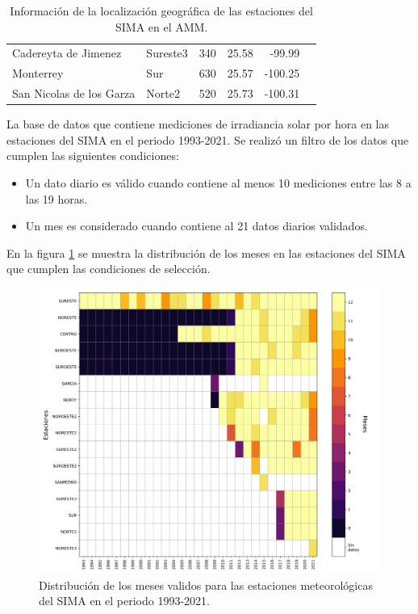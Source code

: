 \begin{table}[H]
\begin{tabular}{llcrrr}
		Cadereyta de Jimenez     & Sureste3        & 340                                                                                       & 25.58                 & -99.99                 \\
		Monterrey                & Sur             & 630                                                                                       & 25.57                 & -100.25                \\
		San Nicolas de los Garza & Norte2          & 520                                                                                       & 25.73                 & -100.31                \\ \hline
	\end{tabular}
	\caption{Información de la localización geográfica de las estaciones del SIMA en el AMM.}
	\label{table:stations_information}
\end{table}
La base de datos que contiene mediciones de irradiancia solar por hora en las estaciones del SIMA en el periodo 1993-2021. Se realizó un filtro de los datos que cumplen las siguientes condiciones:
\begin{itemize}
	\item Un dato diario es válido cuando contiene al menos 10 mediciones entre las 8 a las 19 horas.
	\item Un mes es considerado cuando contiene al 21 datos diarios validados.
\end{itemize}
En la figura \ref{fig:distribution_data} se muestra la distribución de los meses en las estaciones del SIMA que cumplen las condiciones de selección.
\begin{figure}[H]
	\centering
	\includegraphics[width=13cm]{Graphics/Distribution_stations.png}
	\caption{Distribución de los meses validos para las estaciones meteorológicas del SIMA en el periodo 1993-2021.}
	\label{fig:distribution_data}
\end{figure}
